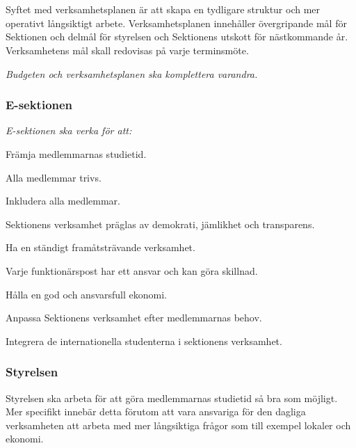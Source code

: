 \documentclass[10pt]{article}
\begin{document}
    \section*{\doctitle}
    Syftet med verksamhetsplanen är att skapa en tydligare struktur och mer operativt långsiktigt arbete. Verksamhetsplanen innehåller övergripande mål för Sektionen och delmål för styrelsen och Sektionens utskott för nästkommande år. Verksamhetens mål skall redovisas på varje terminsmöte.
    
    \emph{Budgeten och verksamhetsplanen ska komplettera varandra.}
    
    \subsubsection*{E-sektionen}
    \emph{E-sektionen ska verka för att:}
    \begin{dashlist}
        \item Främja medlemmarnas studietid. 
        \item Alla medlemmar trivs.
        \item Inkludera alla medlemmar. 
        \item Sektionens verksamhet präglas av demokrati, jämlikhet och transparens.
        \item Ha en ständigt framåtsträvande verksamhet. 
        \item Varje funktionärspost har ett ansvar och kan göra skillnad. 
        \item Hålla en god och ansvarsfull ekonomi. 
        \item Anpassa Sektionens verksamhet efter medlemmarnas behov.
        \item Integrera de internationella studenterna i sektionens verksamhet.
    \end{dashlist}
    
    \subsubsection*{Styrelsen}
    Styrelsen ska arbeta för att göra medlemmarnas studietid så bra som möjligt. Mer specifikt innebär detta förutom att vara ansvariga för den dagliga verksamheten att arbeta med mer långsiktiga frågor som till exempel lokaler och ekonomi. 
    
\end{document}
